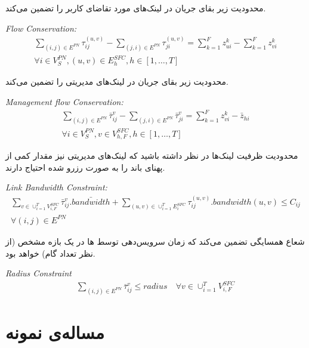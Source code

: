 محدودیت زیر بقای جریان در لینک‌های مورد تقاضای کاربر را تضمین می‌کند.
\begin{latin}
    \textit{Flow Conservation:}
    \begin{align}
        \sum_{(i,j) \in E^{PN}} \tau_{ij}^{(u,v)} - \sum_{(j,i) \in E^{PN}} \tau_{ji}^{(u,v)} = \sum_{k=1}^{F} z_{ui}^{k} - \sum_{k=1}^{F} z_{vi}^{k} \nonumber \\
        \forall i \in V_{S}^{PN}, (u,v) \in E_{h}^{SFC}, h \in [1,\ldots, T]
    \end{align}
\end{latin}

محدودیت زیر بقای جریان در لینک‌های مدیریتی را تضمین می‌کند.
\begin{latin}
    \textit{Management flow Conservation:}
    \begin{align}
        \sum_{(i,j) \in E^{PN}} \bar{\tau}_{ij}^{v} - \sum_{(j,i) \in E^{PN}} \bar{\tau}_{ji}^{v} = \sum_{k=1}^{F} z_{vi}^{k} - \bar{z}_{hi} \nonumber \\
        \forall i \in V_{S}^{PN}, v \in V_{h, F}^{SFC}, h \in [1,\ldots, T]
    \end{align}
\end{latin}

محدودیت ظرفیت لینک‌ها
در نظر داشته باشید که لینک‌های مدیریتی نیز مقدار کمی از پهنای باند را به صورت رزرو شده احتیاج دارند.
\begin{latin}
    \textit{Link Bandwidth Constraint:}
    \begin{align}
        \sum_{v \in \cup_{i=1}^{T} V_{i,F}^{SFC}} \bar{\tau}_{ij}^{v} . \bar{bandwidth} + \sum_{(u,v) \in \cup_{i=1}^{T} E_{i}^{SFC}} \tau_{ij}^{(u,v)} . bandwidth(u,v) \le C_{ij} \nonumber \\
        \forall (i, j) \in E^{PN}
    \end{align}
\end{latin}

شعاع همسایگی تضمین می‌کند که زمان سرویس‌دهی توسط
ها
در یک بازه مشخص (از نظر تعداد گام)
خواهد بود.
\begin{latin}
    \textit{Radius Constraint}
    \begin{align}
        \sum_{(i, j) \in E^{PN}} \bar{\tau}_{ij}^{v} \le radius
        \quad
        \forall v \in \cup_{i=1}^T V_{i, F}^{SFC}
    \end{align}
\end{latin}

\section{مساله‌ی نمونه}

